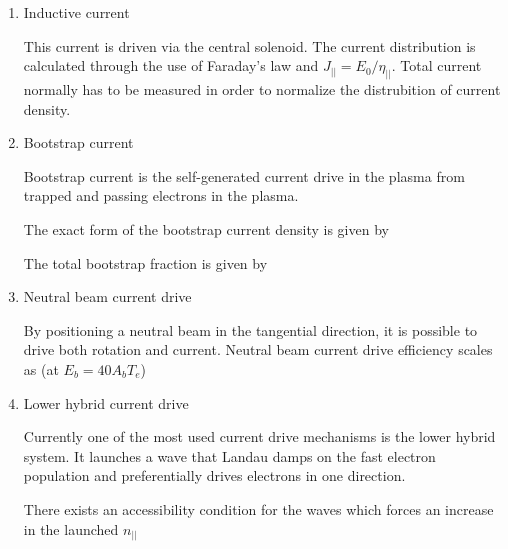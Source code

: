 \begin{enumerate}

\item{Inductive current

This current is driven via the central solenoid. The current distribution is 
calculated through the use of Faraday's law and $J_{||}=E_{0}/\eta_{||}$. 
Total current normally has to be measured in order to normalize the distrubition of
 current density.
}
\item{Bootstrap current

Bootstrap current is the self-generated current drive in the plasma from trapped and passing electrons in the plasma. 

The exact form of the bootstrap current density is given by 


\noindent The total bootstrap fraction is given by 

}
\item{Neutral beam current drive

By positioning a neutral beam in the tangential direction, it is
possible to drive both rotation and current. Neutral beam current
drive efficiency scales as (at $E_{b}=40 A_{b} T_{e}$) \cite{cordey}

}

\item{Lower hybrid current drive

Currently one of the most used current drive mechanisms is the lower
hybrid system. It launches a wave that Landau damps on the fast
electron population and preferentially drives electrons in one
direction. 


\noindent There exists an accessibility condition for the waves which forces an increase in the launched $n_{||}$ 

}
\end{enumerate}

